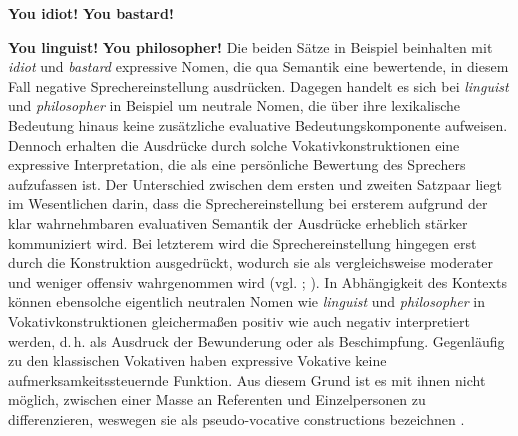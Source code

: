 \ea  \label{ExVo}
\ea \textbf{You idiot!} \label{idiot}
\ex \textbf{You bastard!} \label{bastard0}
 \z
 \z

\ea  \label{ExVo2}
\ea \textbf{You linguist!} \label{linguist}
\ex \textbf{You philosopher!} \label{philosopher}
 \z
 \z
Die beiden Sätze in Beispiel  beinhalten mit \textit{idiot} und \textit{bastard} expressive Nomen, die qua Semantik eine bewertende, in diesem Fall negative Sprechereinstellung ausdrücken. Dagegen handelt es sich bei \textit{linguist} und \textit{philosopher} {in Beispiel } um neutrale Nomen, die über ihre lexikalische Bedeutung hinaus keine zusätzliche evaluative Bedeutungskomponente aufweisen. Dennoch erhalten die Ausdrücke durch solche Vokativkonstruktionen eine expressive Interpretation, die als eine persönliche Bewertung des Sprechers aufzufassen ist. Der Unterschied zwischen dem ersten und zweiten Satzpaar liegt im Wesentlichen darin, dass die Sprechereinstellung bei ersterem aufgrund der klar wahrnehmbaren evaluativen Semantik der Ausdrücke erheblich stärker kommuniziert wird. Bei letzterem wird die Sprechereinstellung hingegen erst durch die Konstruktion ausgedrückt, wodurch sie als vergleichsweise moderater und weniger offensiv wahrgenommen wird (vgl. {\citealt[212]{dAvis.2013}}; {\citealt[188f.]{Gutzmann.2019a}}). In Abhängigkeit des Kontexts können ebensolche eigentlich neutralen Nomen wie \textit{linguist} und \textit{philosopher} in Vokativkonstruktionen gleichermaßen positiv wie auch negativ interpretiert werden, d.\,h. als Ausdruck der Bewunderung oder als Beschimpfung. Gegenläufig zu den klassischen Vokativen haben expressive Vokative keine aufmerksamkeitssteuernde Funktion. Aus diesem Grund ist es mit ihnen nicht möglich, zwischen einer Masse an Referenten und Einzelpersonen zu differenzieren, weswegen sie \citet[]{dAvis.2013} als \glqq{}pseudo-vocative constructions\grqq{} bezeichnen {\citep[vgl.][189]{Gutzmann.2019a}}.


